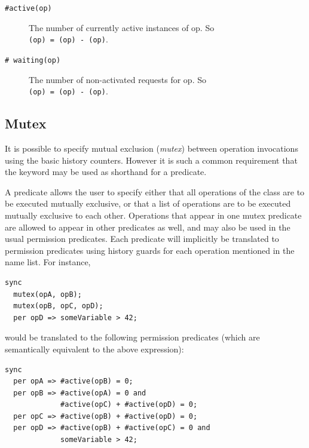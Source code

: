 \documentclass{overturerepchap}
\begin{document}
\begin{description}
\item[\texttt{\#active(op)}] The number of currently active instances
of op.  So \\ {\bf{}}\texttt{(op) = }{\bf{}}\texttt{(op) - }{\bf{}}\texttt{(op)}.
\item[\texttt{\# waiting(op)}] The number of non-activated requests for
op.  So \\ {\bf{}}\texttt{(op) = }{\bf{}}\texttt{(op) - }{\bf{}}\texttt{(op)}.
\end{description}

\subsection{Mutex}

It is possible to specify mutual exclusion (\emph{mutex}) between operation
invocations using the basic history counters. However it is such a
common requirement that the keyword {\bf{}} may be used as shorthand for
a {\bf{}} predicate.

A {\bf{}} predicate allows the user to specify either
that all operations of the class are to be executed mutually
exclusive, or that a list of operations are to be executed mutually
exclusive to each other. Operations that appear in one mutex predicate
are allowed to appear in other {\bf{}} predicates as
well, and may also be used in the usual permission predicates. Each
{\bf{}} predicate will implicitly be translated to
permission predicates using history guards for each operation
mentioned in the name list. For instance,

\begin{lstlisting}
sync
  mutex(opA, opB);
  mutex(opB, opC, opD);
  per opD => someVariable > 42;
\end{lstlisting}

\noindent
would be translated to the following permission predicates (which are
semantically equivalent to the above expression):

\begin{lstlisting}
sync
  per opA => #active(opB) = 0;
  per opB => #active(opA) = 0 and
             #active(opC) + #active(opD) = 0;
  per opC => #active(opB) + #active(opD) = 0;
  per opD => #active(opB) + #active(opC) = 0 and
             someVariable > 42;
\end{lstlisting}
\end{document}

